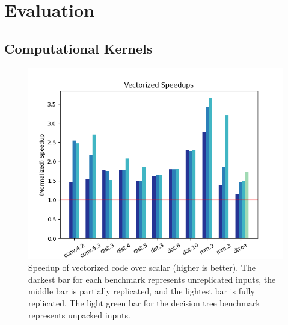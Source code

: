 \section{Evaluation}\label{sec:eval}




\subsection{Computational Kernels}
\begin{figure}
    \includegraphics[width=0.7\linewidth]{figures/graphs/vector_speedups.png}
    \caption{Speedup of vectorized code over scalar (higher is better). The darkest bar for each benchmark represents unreplicated inputs, the middle bar is partially replicated, and the lightest bar is fully replicated. The light green bar for the decision tree benchmark represents unpacked inputs.}\label{fig:vector-speedups}
\end{figure}

